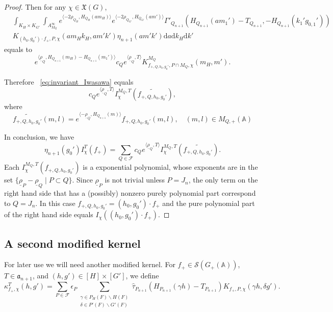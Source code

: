 \documentclass[letterpaper,11pt]{amsart}
\newcommand{\fa}{\mathfrak{a}}
\newcommand{\fX}{\mathfrak{X}}
\newcommand{\bA}{\mathbb{A}}
\newcommand{\cF}{\mathcal{F}}
\newcommand{\cS}{\mathcal{S}}
\newcommand{\rd}{\mathrm{d}}
\newcommand{\bs}{\backslash}
\newcommand{\<}{\negthickspace}
\theoremstyle{definition}
\theoremstyle{plain}
\theoremstyle{remark}
\numberwithin{equation}{section}
\begin{document}
\begin{proof}
Then for any $\chi \in \fX(G)$,
 \begin{align*}
       & \int_{K_H \times K_{G'}} \int_{A_{M_Q}^\infty}
    e^{\langle -2\rho_{Q_H}, H_{Q_H}(am_H) \rangle}
    e^{\langle -2\rho_{Q_{G'}}, H_{Q_{G'}}(am') \rangle}
    \Gamma'_{Q_{n+1}}(H_{Q_{n+1}}(am_1')-T_{Q_{n+1}},
    -H_{Q_{n+1}}(k_1' g_{0,1}'))\\
    & K_{(h_0, g_0') \cdot f_+,P,\chi}(am_H k_H, am'k')
    \eta_{n+1}(am'k')  \rd a \rd k_H \rd k'
    \end{align*}
    equals to
    \[
    e^{\langle \underline{\rho}_Q, H_{Q_{n+1}}(m_H) - H_{Q_{n+1}}(m_1') \rangle} c_Q e^{ \langle \underline{\rho}_Q, T \rangle} K_{f_{+,Q,h_0,g_0'},P \cap M_Q,\chi}^{M_Q}(m_H,m').
    \]

Therefore ~\eqref{eq:invariant_Iwasawa} equals
    \[
    c_Q e^{\langle \underline{\rho}_Q,T \rangle}
    I_{\chi}^{M_Q,T}(\widetilde{f_{+, Q, h_0, g_0'}}),
    \]
where
    \[
       \widetilde{f_{+,Q,h_0,g_0'}}(m,l)= e^{ \langle -\underline{\rho}_Q,
    H_{Q_{n+1}}(m)\rangle} f_{+,Q,h_0,g_0'}(m,l), \quad (m, l) \in M_{Q, +}(\bA)
    \]

In conclusion, we have
    \[
    \eta_{n+1}(g_0') I_\chi^{T}(f_+) = \sum_{Q \in \cF}
    c_Q  e^{\langle \underline{\rho}_Q, T \rangle}
    I_{\chi}^{M_Q,T}(\widetilde{f_{+, Q, h_0, g_0'}}).
    \]
Each $I_{\chi}^{M_Q,T}(f_{+, Q, h_0, g_0'})$ is a exponential polynomial,
whose exponents are in the set $\{\underline{\rho}_P - \underline{\rho}_Q
\mid P \subset Q \}$. Since $\underline{\rho}_P$ is not trivial unless
$P = J_n$, the only term on the right hand side
that has a (possibly) nonzero purely polynomial part correspond to $Q =
J_n$. In this case $f_{+, Q, h_0, g_0'} = (h_0, g_0') \cdot f_+$ and
the pure polynomial part of the right hand side equals
$I_\chi((h_0, g_0') \cdot f_+)$.
\end{proof}


\subsection{A second modified kernel}
For later use we will need another modified kernel. For $f_+ \in
\cS(G_+(\bA))$, $T \in \fa_{n+1}$, and $(h, g') \in [H] \times [G']$, we
define
    \[
    \kappa_{f_+, \chi}^T(h, g') = \sum_{P \in \cF}
    \epsilon_P \sum_{\substack{\gamma \in P_H(F) \bs H(F)\\
    \delta \in P'(F) \bs G'(F)}}
    \widehat{\tau}_{P_{n+1}}(H_{P_{n+1}}(\gamma h) - T_{P_{n+1}})
    K_{f_+, P, \chi}(\gamma h, \delta g').
    \]
\end{document}
